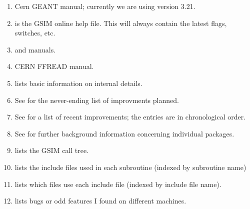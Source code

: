 \documentclass{article}
\begin{document}
\begin{enumerate}

\item Cern GEANT manual; currently we are using version 3.21.

\item %
is the GSIM online help file.  This will
always contain the latest flags, switches, etc.

\item %
and %
manuals.

\item CERN FFREAD manual.

\item %
lists basic information on internal
details.

\item  See %
for the never-ending list of
improvments planned.

\item See %
for a list of recent
improvements; the entries are in chronological order.

\item See %
for further background information concerning individual packages.

\item %
lists the GSIM call tree.

\item %
lists the include files
used in each subroutine (indexed by subroutine name)

\item %
lists which files use each
include file (indexed by include file name).

\item %
lists bugs or odd features I found on different machines.

\end{enumerate}
\end{document}
